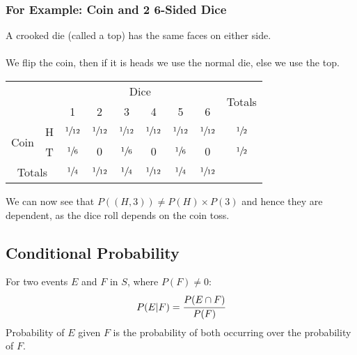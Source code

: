 \documentclass{report}
\begin{document}
\subsubsection*{For Example: Coin and 2 6-Sided Dice}
A crooked die (called a top) has the same faces on either side.
\\
\\ We flip the coin, then if it is heads we use the normal die, else we use the top.
\begin{center}
	\begin{tabular}{c c c c c c c c c}
		\setlength{\tabcolsep}{3em}
		                           &                & \multicolumn{6}{c}{Dice} & \multirow{2}{*}{Totals}                                                                                          \\
		                           &                & 1                        & 2                       & 3               & 4               & 5               & 6               &                \\
		\multirow{2}{*}{Coin}      & H              & $\sfrac{1}{12}$          & $\sfrac{1}{12}$         & $\sfrac{1}{12}$ & $\sfrac{1}{12}$ & $\sfrac{1}{12}$ & $\sfrac{1}{12}$ & $\sfrac{1}{2}$ \\
		                           & T              & $\sfrac{1}{6}$           & $0$                     & $\sfrac{1}{6}$  & $0$             & $\sfrac{1}{6}$  & $0$             & $\sfrac{1}{2}$ \\
		\multicolumn{2}{c}{Totals} & $\sfrac{1}{4}$ & $\sfrac{1}{12}$          & $\sfrac{1}{4}$          & $\sfrac{1}{12}$ & $\sfrac{1}{4}$  & $\sfrac{1}{12}$ &                                  \\
	\end{tabular}
\end{center}
We can now see that $P({(H,3)}) \neq P({H}) \times P({3})$ and hence they are dependent, as the dice roll depends on the coin toss.

\subsection*{Conditional Probability}
For two events $E$ and $F$ in  $S$, where $P(F) \neq 0$:
\[P(E|F) = \cfrac{P(E \cap F)}{P(F)}\]
Probability of $E$ given $F$ is the probability of both occurring over the probability of $F$.
\end{document}
